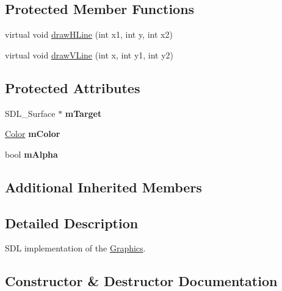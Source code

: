 \subsection*{Protected Member Functions}
\begin{DoxyCompactItemize}
\item 
virtual void \hyperlink{classgcn_1_1SDLGraphics_ade0cc714be37c6a845a0e80737f848a0}{draw\+H\+Line} (int x1, int y, int x2)
\item 
virtual void \hyperlink{classgcn_1_1SDLGraphics_a425d9b80490169dddfaf37ba3d6724cf}{draw\+V\+Line} (int x, int y1, int y2)
\end{DoxyCompactItemize}
\subsection*{Protected Attributes}
\begin{DoxyCompactItemize}
\item 
S\+D\+L\+\_\+\+Surface $\ast$ {\bfseries m\+Target}\hypertarget{classgcn_1_1SDLGraphics_af3f955105466dd80c1577abf8126089c}{}\label{classgcn_1_1SDLGraphics_af3f955105466dd80c1577abf8126089c}

\item 
\hyperlink{classgcn_1_1Color}{Color} {\bfseries m\+Color}\hypertarget{classgcn_1_1SDLGraphics_a2801f09228c3d44c104172a2a94c5249}{}\label{classgcn_1_1SDLGraphics_a2801f09228c3d44c104172a2a94c5249}

\item 
bool {\bfseries m\+Alpha}\hypertarget{classgcn_1_1SDLGraphics_ac56f362fd6f04bd5f02390d6536e6f47}{}\label{classgcn_1_1SDLGraphics_ac56f362fd6f04bd5f02390d6536e6f47}

\end{DoxyCompactItemize}
\subsection*{Additional Inherited Members}


\subsection{Detailed Description}
S\+DL implementation of the \hyperlink{classgcn_1_1Graphics}{Graphics}. 

\subsection{Constructor \& Destructor Documentation}
